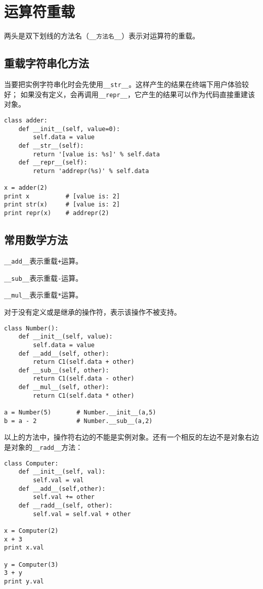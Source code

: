 \section{运算符重载}

两头是双下划线的方法名（\verb|__方法名__|）表示对运算符的重载。

\subsection{重载字符串化方法}

当要把实例字符串化时会先使用\verb|__str__|。这样产生的结果在终端下用户体验较好； 如果没有定义，会再调用\verb|__repr__|，它产生的结果可以作为代码直接重建该对象。

\begin{lstlisting}
class adder:
	def __init__(self, value=0):
		self.data = value
	def __str__(self):
		return '[value is: %s]' % self.data
	def __repr__(self):
		return 'addrepr(%s)' % self.data

x = adder(2)
print x          # [value is: 2]
print str(x)     # [value is: 2]
print repr(x)    # addrepr(2)
\end{lstlisting}

\subsection{常用数学方法}

\verb|__add__|表示重载\verb|+|运算。

\verb|__sub__|表示重载\verb|-|运算。

\verb|__mul__|表示重载\verb|*|运算。

对于没有定义或是继承的操作符，表示该操作不被支持。

\begin{lstlisting}
class Number():
	def __init__(self, value):
		self.data = value
	def __add__(self, other):
		return C1(self.data + other)
	def __sub__(self, other):
		return C1(self.data - other)
	def __mul__(self, other):
		return C1(self.data * other)

a = Number(5)       # Number.__init__(a,5)
b = a - 2           # Number.__sub__(a,2)
\end{lstlisting}

以上的方法中，操作符右边的不能是实例对象。还有一个相反的左边不是对象右边是对象的\verb|__radd__|方法：

\begin{lstlisting}
class Computer:
	def __init__(self, val):
		self.val = val
	def __add__(self,other):
		self.val += other
	def __radd__(self, other):
		self.val = self.val + other

x = Computer(2)
x + 3
print x.val

y = Computer(3)
3 + y
print y.val
\end{lstlisting}


